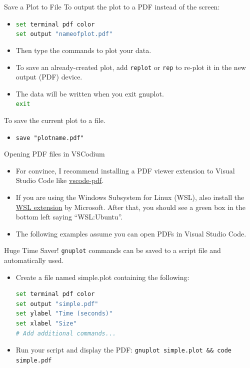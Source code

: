\documentclass[14pt,aspectratio=1610, hyperref={pdfpagelayout=SinglePage}]{beamer}
\begin{document}
\begin{frame}{Save a Plot to File}
To output the plot to a PDF instead of the screen:\\
\begin{itemize}
  \item \lstinline[language=Bash]{set terminal pdf color}\\
    \lstinline[language=Bash]{set output "nameofplot.pdf"}\\
  \item Then type the commands to plot your data.\\
  \item To save an already-created plot, add \lstinline{replot} or \lstinline{rep}
    to re-plot it in the new output (PDF) device.\\
  \item The data will be written when you exit gnuplot.\\\lstinline[language=Bash]{exit}\\
\end{itemize}

To save the current plot to a file.\\
\begin{itemize}
  \item\lstinline{save "plotname.pdf"}
\end{itemize}
\end{frame}

\begin{frame}{Opening PDF files in VSCodium}
\begin{itemize}
  \item
    For convince, I recommend installing a PDF viewer extension to Visual Studio Code like \href{https://marketplace.visualstudio.com/items?itemName=tomoki1207.pdf}{vscode-pdf}.
  \item
    If you are using the Windows Subsystem for Linux (WSL), also install the \href{https://marketplace.visualstudio.com/items?itemName=ms-vscode-remote.remote-wsl}{WSL extension} by Microsoft. After that, you should see a green box in the bottom left saying ``WSL:Ubuntu''.
  \item
    The following examples assume you can open PDFs in Visual Studio Code.
\end{itemize}
\end{frame}

\begin{frame}[fragile]{Huge Time Saver!}
\texttt{gnuplot} commands can be saved to a script file and automatically used.
\begin{itemize}
\item Create a file named simple.plot containing the following:\\
  \begin{lstlisting}[language=Bash, basicstyle=\small\bfseries\ttfamily]
set terminal pdf color
set output "simple.pdf"
set ylabel "Time (seconds)"
set xlabel "Size"
# Add additional commands...
\end{lstlisting}
\item Run your script and display the PDF: \lstinline{gnuplot simple.plot && code simple.pdf}
\end{itemize}
\end{frame}
\end{document}
